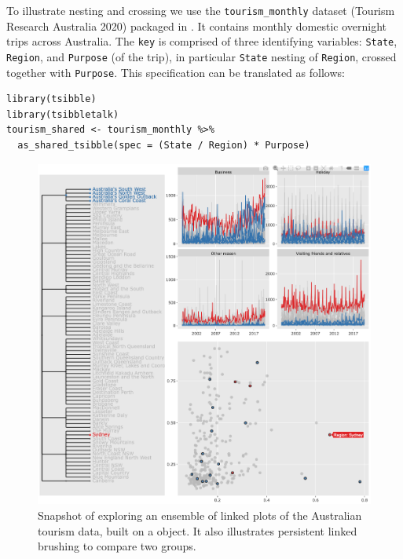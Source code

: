 To illustrate nesting and crossing we use the \texttt{tourism\_monthly} dataset (Tourism Research Australia 2020) packaged in . It contains monthly domestic overnight trips across Australia. The \texttt{key} is comprised of three identifying variables: \texttt{State}, \texttt{Region}, and \texttt{Purpose} (of the trip), in particular \texttt{State} nesting of \texttt{Region}, crossed together with \texttt{Purpose}. This specification can be translated as follows:

\begin{verbatim}
library(tsibble)
library(tsibbletalk)
tourism_shared <- tourism_monthly %>% 
  as_shared_tsibble(spec = (State / Region) * Purpose)
\end{verbatim}

\begin{figure}

{\centering \includegraphics[width=\textwidth]{img/tourism-linking} 

}

\caption{Snapshot of exploring an ensemble of linked plots of the Australian tourism data, built on a  object. It also illustrates persistent linked brushing to compare two groups.}\label{fig:tourism-linking-fig}
\end{figure}

